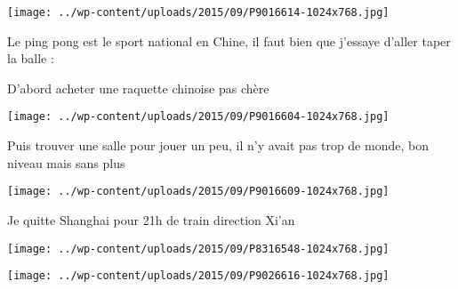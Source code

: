  

\begin{center} \texttt{[image: ../wp-content/uploads/2015/09/P9016614-1024x768.jpg]} \end{center}

 

 Le ping pong est le sport national en Chine, il faut bien que j'essaye d'aller taper la balle : 

 D'abord acheter une raquette chinoise pas chère 

 

\begin{center} \texttt{[image: ../wp-content/uploads/2015/09/P9016604-1024x768.jpg]} \end{center}

 

 Puis trouver une salle pour jouer un peu, il n'y avait pas trop de monde, bon niveau mais sans plus 

 

\begin{center} \texttt{[image: ../wp-content/uploads/2015/09/P9016609-1024x768.jpg]} \end{center}

 

 Je quitte Shanghai pour 21h de train direction Xi'an 

 

\begin{center} \texttt{[image: ../wp-content/uploads/2015/09/P8316548-1024x768.jpg]} \end{center}

 

 

\begin{center} \texttt{[image: ../wp-content/uploads/2015/09/P9026616-1024x768.jpg]} \end{center}




 
 
